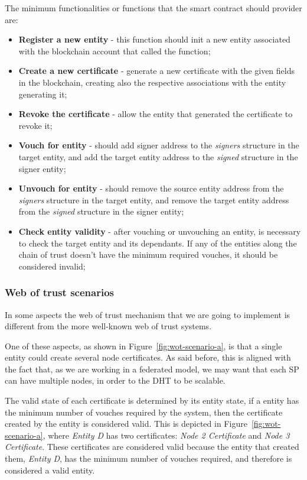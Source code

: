 The minimum functionalities or functions that the smart contract should provider are:

\begin{itemize}
  \item \textbf{Register a new entity} - this function should init a new entity associated with the blockchain account that called the function;
  \item \textbf{Create a new certificate} - generate a new certificate with the given fields in the blockchain, creating also the respective associations with the entity generating it;
  \item \textbf{Revoke the certificate} - allow the entity that generated the certificate to revoke it;
  \item \textbf{Vouch for entity} - should add signer address to the \textit{signers} structure in the target entity, and add the target entity address to the \textit{signed} structure in the signer entity;
  \item \textbf{Unvouch for entity} - should remove the source entity address from the \textit{signers} structure in the target entity, and remove the target entity address from the \textit{signed} structure in the signer entity;
  \item \textbf{Check entity validity} - after vouching or unvouching an entity, is necessary to check the target entity and its dependants. If any of the entities along the chain of trust doesn't have the minimum required vouches, it should be considered invalid;
\end{itemize}


\subsubsection{Web of trust scenarios}

In some aspects the web of trust mechanism that we are going to implement is different from the more well-known web of trust systems.

One of these aspects, as shown in Figure~\ref{fig:wot-scenario-a}, is that a single entity could create several node certificates.
As said before, this is aligned with the fact that, as we are working in a federated model, we may want that each \ac{SP} can have multiple nodes, in order to the \ac{DHT} to be scalable.

The valid state of each certificate is determined by its entity state, if a entity has the minimum number of vouches required by the system, then the certificate created by the entity is considered valid.
This is depicted in Figure~\ref{fig:wot-scenario-a}, where \textit{Entity D} has two certificates: \textit{Node 2 Certificate} and \textit{Node 3 Certificate}.
These certificates are considered valid because the entity that created them, \textit{Entity D}, has the minimum number of vouches required, and therefore is considered a valid entity.


